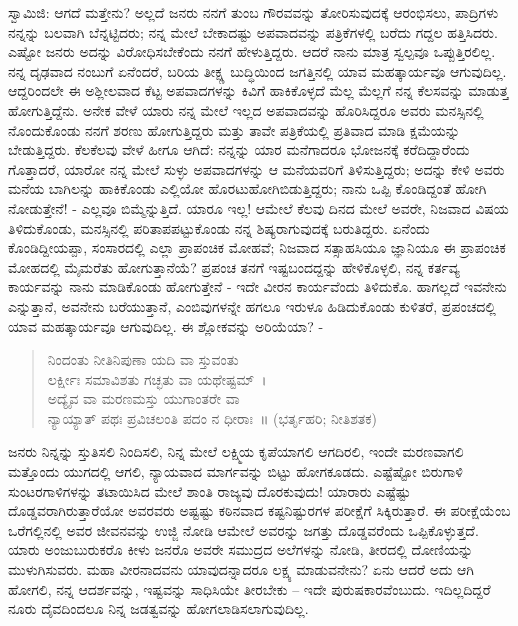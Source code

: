 ಸ್ವಾಮಿಜಿ: ಆಗದೆ ಮತ್ತೇನು? ಅಲ್ಲದೆ ಜನರು ನನಗೆ ತುಂಬ ಗೌರವವನ್ನು ತೋರಿಸುವುದಕ್ಕೆ ಆರಂಭಿಸಲು, ಪಾದ್ರಿಗಳು ನನ್ನನ್ನು ಬಲವಾಗಿ ಬೆನ್ನಟ್ಟಿದರು; ನನ್ನ ಮೇಲೆ ಬೇಕಾದಷ್ಟು ಅಪವಾದವನ್ನು ಪತ್ರಿಕೆಗಳಲ್ಲಿ ಬರೆದು ಗದ್ದಲ ಹತ್ತಿಸಿದರು. ಎಷ್ಟೋ ಜನರು ಅದನ್ನು ವಿರೋಧಿಸಬೇಕೆಂದು ನನಗೆ ಹೇಳುತ್ತಿದ್ದರು. ಆದರೆ ನಾನು ಮಾತ್ರ ಸ್ವಲ್ಪವೂ ಒಪ್ಪುತ್ತಿರಲಿಲ್ಲ. ನನ್ನ ದೃಢವಾದ ನಂಬುಗೆ ಏನೆಂದರೆ, ಬರಿಯ ತೀಕ್ಷ್ಣ ಬುದ್ಧಿಯಿಂದ ಜಗತ್ತಿನಲ್ಲಿ ಯಾವ ಮಹತ್ಕಾರ್ಯವೂ ಆಗುವುದಿಲ್ಲ. ಆದ್ದರಿಂದಲೇ ಈ ಅಶ್ಲೀಲವಾದ ಕೆಟ್ಟ ಅಪವಾದಗಳನ್ನು ಕಿವಿಗೆ ಹಾಕಿಕೊಳ್ಳದೆ ಮೆಲ್ಲ ಮೆಲ್ಲಗೆ ನನ್ನ ಕೆಲಸವನ್ನು ಮಾಡುತ್ತ ಹೋಗುತ್ತಿದ್ದೆನು. ಅನೇಕ ವೇಳೆ ಯಾರು ನನ್ನ ಮೇಲೆ ಇಲ್ಲದ ಅಪವಾದವನ್ನು ಹೊರಿಸಿದ್ದರೂ ಅವರು ಮನಸ್ಸಿನಲ್ಲಿ ನೊಂದುಕೊಂಡು ನನಗೆ ಶರಣು ಹೋಗುತ್ತಿದ್ದರು ಮತ್ತು ತಾವೇ ಪತ್ರಿಕೆಯಲ್ಲಿ ಪ್ರತಿವಾದ ಮಾಡಿ ಕ್ಷಮೆಯನ್ನು ಬೇಡುತ್ತಿದ್ದರು. ಕೆಲಕೆಲವು ವೇಳೆ ಹೀಗೂ ಆಗಿದೆ: ನನ್ನನ್ನು ಯಾರ ಮನೆಗಾದರೂ ಭೋಜನಕ್ಕೆ ಕರೆದಿದ್ದಾರೆಂದು ಗೊತ್ತಾದರೆ, ಯಾರೋ ನನ್ನ ಮೇಲೆ ಸುಳ್ಳು ಅಪವಾದಗಳನ್ನು ಆ ಮನೆಯವರಿಗೆ ತಿಳಿಸುತ್ತಿದ್ದರು; ಅದನ್ನು ಕೇಳಿ ಅವರು ಮನೆಯ ಬಾಗಿಲನ್ನು ಹಾಕಿಕೊಂಡು ಎಲ್ಲಿಯೋ ಹೊರಟುಹೋಗಿಬಿಡುತ್ತಿದ್ದರು; ನಾನು ಒಪ್ಪಿ ಕೊಂಡಿದ್ದಂತೆ ಹೋಗಿ ನೋಡುತ್ತೇನೆ! - ಎಲ್ಲವೂ ಬಿಮ್ಮೆನ್ನುತ್ತಿದೆ. ಯಾರೂ ಇಲ್ಲ! ಆಮೇಲೆ ಕೆಲವು ದಿನದ ಮೇಲೆ ಅವರೇ, ನಿಜವಾದ ವಿಷಯ ತಿಳಿದುಕೊಂಡು, ಮನಸ್ಸಿನಲ್ಲಿ ಪರಿತಾಪಪಟ್ಟುಕೊಂಡು ನನ್ನ ಶಿಷ್ಯರಾಗುವುದಕ್ಕೆ ಬರುತಿದ್ದರು. ಏನೆಂದು ಕೊಂಡಿದ್ದೀಯಪ್ಪಾ, ಸಂಸಾರದಲ್ಲಿ ಎಲ್ಲಾ ಪ್ರಾಪಂಚಿಕ ಮೋಹವೆ; ನಿಜವಾದ ಸತ್ಸಾಹಸಿಯೂ ಜ್ಞಾನಿಯೂ ಈ ಪ್ರಾಪಂಚಿಕ ಮೋಹದಲ್ಲಿ ಮೈಮರೆತು ಹೋಗುತ್ತಾನೆಯೆ? ಪ್ರಪಂಚ ತನಗೆ ಇಷ್ಟಬಂದದ್ದನ್ನು ಹೇಳಿಕೊಳ್ಳಲಿ, ನನ್ನ ಕರ್ತವ್ಯ ಕಾರ್ಯವನ್ನು ನಾನು ಮಾಡಿಕೊಂಡು ಹೋಗುತ್ತೇನೆ - ಇದೇ ವೀರನ ಕಾರ್ಯವೆಂದು ತಿಳಿದುಕೊ. ಹಾಗಲ್ಲದೆ ಇವನೇನು ಎನ್ನುತ್ತಾನೆ, ಅವನೇನು ಬರೆಯುತ್ತಾನೆ, ಎಂಬಿವುಗಳನ್ನೇ ಹಗಲೂ ಇರುಳೂ ಹಿಡಿದುಕೊಂಡು ಕುಳಿತರೆ, ಪ್ರಪಂಚದಲ್ಲಿ ಯಾವ ಮಹತ್ಕಾರ್ಯವೂ ಆಗುವುದಿಲ್ಲ. ಈ ಶ್ಲೋಕವನ್ನು ಅರಿಯೆಯಾ? -

\begin{verse}
ನಿಂದಂತು ನೀತಿನಿಪುಣಾ ಯದಿ ವಾ ಸ್ತುವಂತು\\ಲರ್ಕ್ಷೀಃ ಸಮಾವಿಶತು ಗಚ್ಛತು ವಾ ಯಥೇಷ್ಟಮ್~।\\ಅದ್ಯೈವ ವಾ ಮರಣಮಸ್ತು ಯುಗಾಂತರೇ ವಾ\\ನ್ಯಾಯ್ಯಾತ್ ಪಥಃ ಪ್ರವಿಚಲಂತಿ ಪದಂ ನ ಧೀರಾಃ~॥ (ಭರ್ತೃಹರಿ; ನೀತಿಶತಕ)
\end{verse}

ಜನರು ನಿನ್ನನ್ನು ಸ್ತುತಿಸಲಿ ನಿಂದಿಸಲಿ, ನಿನ್ನ ಮೇಲೆ ಲಕ್ಷ್ಮಿಯ ಕೃಪೆಯಾಗಲಿ ಆಗದಿರಲಿ, ಇಂದೇ ಮರಣವಾಗಲಿ ಮತ್ತೊಂದು ಯುಗದಲ್ಲಿ ಆಗಲಿ, ನ್ಯಾಯವಾದ ಮಾರ್ಗವನ್ನು ಬಿಟ್ಟು ಹೋಗಕೂಡದು. ಎಷ್ಟೆಷ್ಟೋ ಬಿರುಗಾಳಿ ಸುಂಟರಗಾಳಿಗಳನ್ನು ತಟಾಯಿಸಿದ ಮೇಲೆ ಶಾಂತಿ ರಾಜ್ಯವು ದೊರಕುವುದು! ಯಾರಾರು ಎಷ್ಟೆಷ್ಟು ದೊಡ್ಡವರಾಗಿರುತ್ತಾರೆಯೋ ಅವರವರು ಅಷ್ಟಷ್ಟು ಕಠಿನವಾದ ಕಷ್ಟನಿಷ್ಟುರಗಳ ಪರೀಕ್ಷೆಗೆ ಸಿಕ್ಕಿರುತ್ತಾರೆ. ಈ ಪರೀಕ್ಷೆಯೆಂಬ ಒರೆಗಲ್ಲಿನಲ್ಲಿ ಅವರ ಜೀವನವನ್ನು ಉಜ್ಜಿ ನೋಡಿ ಆಮೇಲೆ ಅವರನ್ನು ಜಗತ್ತು ದೊಡ್ಡವರೆಂದು ಒಪ್ಪಿಕೊಳ್ಳುತ್ತದೆ. ಯಾರು ಅಂಜುಬುರುಕರೊ ಕೀಳು ಜನರೊ ಅವರೇ ಸಮುದ್ರದ ಅಲೆಗಳನ್ನು ನೋಡಿ, ತೀರದಲ್ಲಿ ದೋಣಿಯನ್ನು ಮುಳುಗಿಸುವರು. ಮಹಾ ವೀರನಾದವನು ಯಾವುದನ್ನಾದರೂ ಲಕ್ಷ್ಯ ಮಾಡುವನೇನು? ಏನು ಆದರೆ ಅದು ಆಗಿ ಹೋಗಲಿ, ನನ್ನ ಆದರ್ಶವನ್ನು, ಇಷ್ಟವನ್ನು ಸಾಧಿಸಿಯೇ ತೀರಬೇಕು – ಇದೇ ಪುರುಷಕಾರವೆಂಬುದು. ಇದಿಲ್ಲದಿದ್ದರೆ ನೂರು ದೈವದಿಂದಲೂ ನಿನ್ನ ಜಡತ್ವವನ್ನು ಹೋಗಲಾಡಿಸಲಾಗುವುದಿಲ್ಲ.

